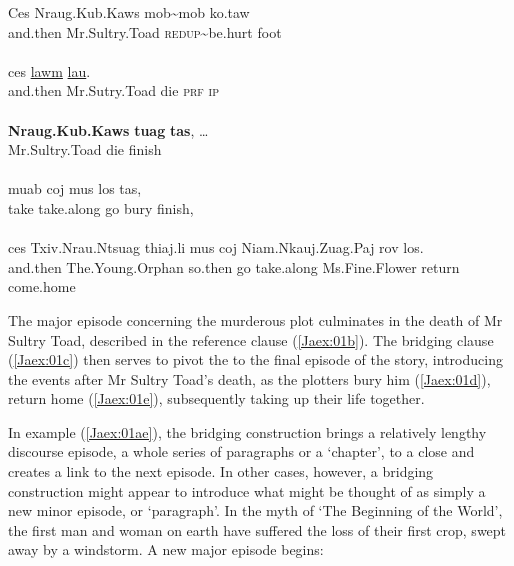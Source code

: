 \documentclass[output=paper]{LSP/langsci}
\begin{document}
\begin{exe}
\ex \label{Jaex:01ae}
\begin{xlist}
\ex \label{Jaex:01a}
\gll Ces Nraug.Kub.Kaws mob{\textasciitilde}mob ko.taw\\
and.then Mr.Sultry.Toad \textsc{redup}{\textasciitilde}be.hurt foot\\
\glt {}\\
\ex \label{Jaex:01b}
\gll ces \underline{} \underline{} \underline{lawm} \underline{lau}.\\
and.then Mr.Sutry.Toad die \textsc{prf} \textsc{ip}\\ 
\glt {}\\
\ex \label{Jaex:01c}
\gll \textbf{Nraug.Kub.Kaws} \textbf{tuag} \textbf{tas}, …\\		
Mr.Sultry.Toad die finish \\ 
\glt {}\\
\ex \label{Jaex:01d}
\gll muab coj mus los tas, \\		           
take take.along go bury finish,\\
\glt {}\\
\ex \label{Jaex:01e}
\gll ces Txiv.Nrau.Ntsuag thiaj.li mus coj Niam.Nkauj.Zuag.Paj rov los.\\     	      
and.then The.Young.Orphan so.then go take.along Ms.Fine.Flower return come.home\\
\glt {} \citep[][140]{johnson92}
\end{xlist}
\end{exe}

\noindent
The major episode concerning the murderous plot culminates in the death of Mr Sultry Toad, described in the reference clause (\ref{Jaex:01b}). The bridging clause (\ref{Jaex:01c}) then serves to pivot the  to the final episode of the story, introducing the events after Mr Sultry Toad’s death, as the plotters bury him (\ref{Jaex:01d}), return home (\ref{Jaex:01e}), subsequently taking up their life together. 
 
In example (\ref{Jaex:01ae}), the bridging construction brings a relatively lengthy discourse episode, a whole series of paragraphs or a `chapter', to a close and creates a link to the next episode. In other cases, however, a bridging construction might appear to introduce what might be thought of as simply a new minor episode, or `paragraph'. In the myth of `The Beginning of the World', the first man and woman on earth have suffered the loss of their first crop, swept away by a windstorm. A new major episode begins:
\end{document}
